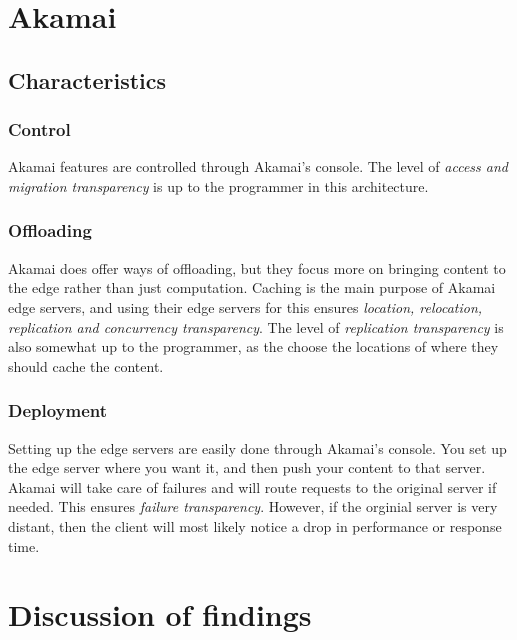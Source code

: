 




\section{Akamai}
\subsection{Characteristics}
\subsubsection{Control}
Akamai features are controlled through Akamai's console. The level of \textit{access and migration transparency} is up to the programmer in this architecture.

\subsubsection{Offloading}
Akamai does offer ways of offloading, but they focus more on bringing content to the edge rather than just computation. Caching is the main purpose of Akamai edge servers, and using their edge servers for this ensures \textit{location, relocation, replication and concurrency transparency}. The level of \textit{replication transparency} is also somewhat up to the programmer, as the choose the locations of where they should cache the content.

\subsubsection{Deployment}
Setting up the edge servers are easily done through Akamai's console. You set up the edge server where you want it, and then push your content to that server. Akamai will take care of failures and will route requests to the original server if needed. This ensures \textit{failure transparency}. However, if the orginial server is very distant, then the client will most likely notice a drop in performance or response time.






\section{Discussion of findings}

